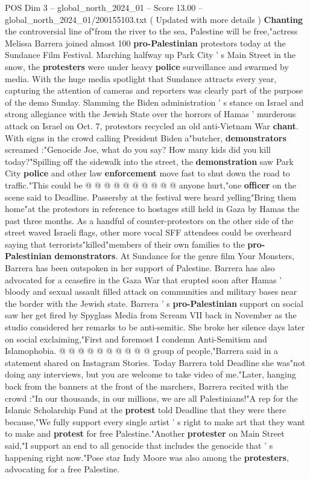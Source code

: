 \begin{textsample}{POS Dim 3 – global\_north\_2024\_01 – Score 13.00 – global\_north\_2024\_01/200155103.txt}  \label{ex:f3_pos_246}
( Updated with more details ) \textbf{Chanting} the controversial line of"from the river to the sea, Palestine will be free,"actress Melissa Barrera joined almost 100 \textbf{pro-Palestinian} protestors today at the Sundance Film Festival.
Marching halfway up Park City ' s Main Street in the snow, the \textbf{protesters} were under heavy \textbf{police} surveillance and swarmed by media.
With the huge media spotlight that Sundance attracts every year, capturing the attention of cameras and reporters was clearly part of the purpose of the demo Sunday.
Slamming the Biden administration ' s stance on Israel and strong allegiance with the Jewish State over the horrors of Hamas ' murderous attack on Israel on Oct. 7, protestors recycled an old anti-Vietnam War \textbf{chant}.
With signs in the crowd calling President Biden a"butcher, \textbf{demonstrators} screamed :"Genocide Joe, what do you say?
How many kids did you kill today?"Spilling off the sidewalk into the street, the \textbf{demonstration} saw Park City \textbf{police} and other law \textbf{enforcement} move fast to shut down the road to traffic."This could be @ @ @ @ @ @ @ @ @ @ anyone hurt,"one \textbf{officer} on the scene said to Deadline.
Passersby at the festival were heard yelling"Bring them home"at the protestors in reference to hostages still held in Gaza by Hamas the past three months.
As a handful of counter-protestors on the other side of the street waved Israeli flags, other more vocal SFF attendees could be overheard saying that terrorists"killed"members of their own families to the \textbf{pro-Palestinian} \textbf{demonstrators}.
At Sundance for the genre film Your Monsters, Barrera has been outspoken in her support of Palestine.
Barrera has also advocated for a ceasefire in the Gaza War that erupted soon after Hamas ' bloody and sexual assault filled attack on communities and military bases near the border with the Jewish state.
Barrera ' s \textbf{pro-Palestinian} support on social saw her get fired by Spyglass Media from Scream VII back in November as the studio considered her remarks to be anti-semitic.
She broke her silence days later on social exclaiming,"First and foremost I condemn Anti-Semitism and Islamophobia. @ @ @ @ @ @ @ @ @ @ group of people,"Barrera said in a statement shared on Instagram Stories.
Today Barrera told Deadline she was"not doing any interviews, but you are welcome to take video of me."Later, hanging back from the banners at the front of the marchers, Barrera recited with the crowd :"In our thousands, in our millions, we are all Palestinians!"A rep for the Islamic Scholarship Fund at the \textbf{protest} told Deadline that they were there because,"We fully support every single artist ' s right to make art that they want to make and \textbf{protest} for free Palestine."Another \textbf{protester} on Main Street said,"I support an end to all genocide that includes the genocide that ' s happening right now."Pose star Indy Moore was also among the \textbf{protesters}, advocating for a free Palestine.

\end{textsample}
